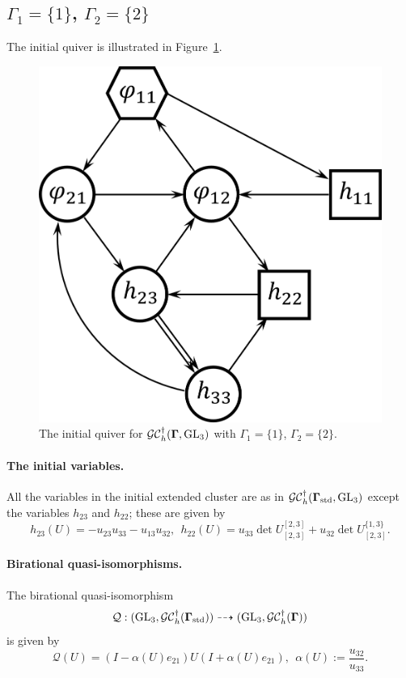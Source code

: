 \subsection{$\Gamma_1 = \{1\}$, $\Gamma_2 = \{2\}$}
The initial quiver is illustrated in Figure~\ref{f:h_n=3_1-2}. 
\begin{figure}[htb]
\begin{center}
\includegraphics[scale=0.65]{h_convention/h_n=3_1-2.png}
\end{center}
\caption{The initial quiver for $\mathcal{GC}_h^{\dagger}(\mathbf{\Gamma},\operatorname{GL}_3)$ with $\Gamma_1 = \{1\}$, $\Gamma_2  = \{2\}$.}
\label{f:h_n=3_1-2}
\end{figure}

\paragraph{The initial variables.} All the variables in the initial extended cluster are as in $\mathcal{GC}_h^{\dagger}(\mathbf{\Gamma}_{\text{std}},\operatorname{GL}_3)$ except the variables $h_{23}$ and $h_{22}$; these are given by
\begin{equation}
    h_{23}(U) = -u_{23}u_{33}-u_{13}u_{32}, \ \ h_{22}(U) = u_{33} \det U^{[2,3]}_{[2,3]} + u_{32} \det U^{\{1,3\}}_{[2,3]}.
\end{equation}

\paragraph{Birational quasi-isomorphisms.} The birational quasi-isomorphism \[\mathcal{Q}:(\operatorname{GL}_3,\mathcal{GC}_h^{\dagger}(\mathbf{\Gamma}_{\text{std}}))\dashrightarrow (\operatorname{GL}_3,\mathcal{GC}_h^{\dagger}(\mathbf{\Gamma}))\] is given by
\begin{equation}
    \mathcal{Q}(U) = (I-\alpha(U)e_{21})U(I+\alpha(U)e_{21}), \ \ \alpha(U):=\frac{u_{32}}{u_{33}}.
\end{equation}